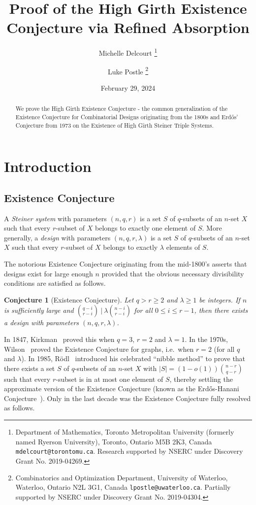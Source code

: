 \documentclass[11pt]{article}
\title{Proof of the High Girth Existence Conjecture via Refined Absorption}
\author{
Michelle Delcourt
\thanks{Department of Mathematics, Toronto Metropolitan University (formerly named Ryerson University),
Toronto, Ontario M5B 2K3, Canada {\tt mdelcourt@torontomu.ca}. Research supported by NSERC under Discovery Grant No. 2019-04269.}
\and
Luke Postle
\thanks{Combinatorics and Optimization Department,
University of Waterloo, Waterloo, Ontario N2L 3G1, Canada {\tt lpostle@uwaterloo.ca}. Partially supported by NSERC
under Discovery Grant No. 2019-04304.}}
\date{February 29, 2024}
\newcounter{i}
\theoremstyle{plain}
\newtheorem{conj}[thm]{Conjecture}
\theoremstyle{plain} %
\theoremstyle{definition}
\begin{document}
\maketitle

\begin{abstract} 
We prove the High Girth Existence Conjecture - the common generalization of the Existence Conjecture for Combinatorial Designs originating from the 1800s and Erd\H{o}s' Conjecture from 1973 on the Existence of High Girth Steiner Triple Systems. 
\end{abstract}

\section{Introduction}

\subsection{Existence Conjecture}

A \emph{Steiner system} with parameters $(n,q,r)$ is a set $S$ of $q$-subsets of an $n$-set $X$ such that every $r$-subset of $X$ belongs to exactly one element of $S$. More generally, a \emph{design} with parameters $(n,q,r,\lambda)$ is a set $S$ of $q$-subsets of an $n$-set $X$ such that every $r$-subset of $X$ belongs to exactly $\lambda$ elements of $S$. 

The notorious Existence Conjecture originating from the mid-1800's asserts that designs exist for large enough $n$ provided that the obvious necessary divisibility conditions are satisfied as follows.

\begin{conj}[Existence Conjecture]\label{conj:Existence}
Let $q > r \ge 2$ and $\lambda \geq 1$ be integers. If $n$ is sufficiently large and $\binom{q-i}{r-i}~|~\lambda \binom{n-i}{r-i}$ for all $0\le i \le r-1$, then there exists a design with parameters $(n,q,r,\lambda)$.
\end{conj}

In 1847, Kirkman~\cite{K47} proved this when $q=3$, $r=2$ and $\lambda=1$. In the 1970s, Wilson~\cite{WI, WII, WIII} proved the Existence Conjecture for graphs, i.e.~when $r=2$ (for all $q$ and $\lambda$). In 1985, R\"{o}dl~\cite{R85} introduced his celebrated ``nibble method'' to prove that there exists a set $S$ of $q$-subsets of an $n$-set $X$ with $|S| = (1-o(1))\binom{n-r}{q-r}$ such that every $r$-subset is in at most one element of $S$, thereby settling the approximate version of the Existence Conjecture (known as the Erd\H{o}s-Hanani Conjecture~\cite{EH63}). Only in the last decade was the Existence Conjecture fully resolved as follows.
\end{document}
